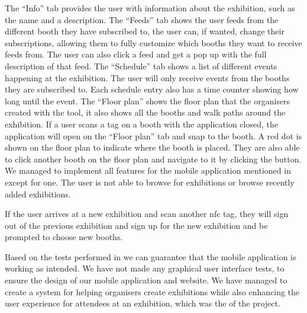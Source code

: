 The ``Info'' tab provides the user with information about the exhibition, such as the name and a description. The ``Feeds'' tab shows the user feeds from the different booth they have subscribed to, the user can, if wanted, change their subscriptions, allowing them to fully customize which booths they want to receive feeds from. The user can also click a feed and get a pop up with the full description of that feed. The ``Schedule'' tab shows a list of different events happening at the exhibition. The user will only receive events from the booths they are subscribed to. Each schedule entry also has a time counter showing how long until the event. The ``Floor plan'' shows the floor plan that the organisers created with the tool, it also shows all the booths and walk paths around the exhibition. If a user scans a tag on a booth with the application closed, the application will open on the ``Floor plan'' tab and snap to the booth. A red dot is shown on the floor plan to indicate where the booth is placed. They are also able to click another booth on the floor plan and navigate to it by clicking the button. We managed to implement all features for the mobile application mentioned in  except for one. The user is not able to browse for exhibitions or browse recently added exhibitions.

If the user arrives at a new exhibition and scan another \ac{nfc} tag, they will sign out of the previous exhibition and sign up for the new exhibition and be prompted to choose new booths. 

Based on the tests performed in  we can guarantee that the mobile application is working as intended. We have not made any graphical user interface tests, to ensure the design of our mobile application and website. We have managed to create a system for helping organisers create exhibitions while also enhancing the user experience for attendees at an exhibition, which was the of the project.